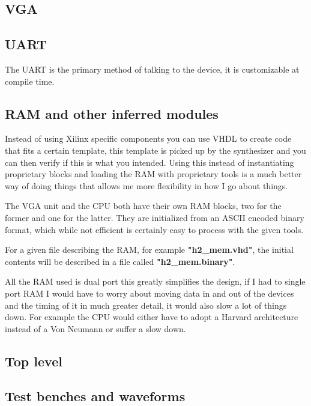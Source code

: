 \documentclass	[a4paper, 10pt]	{article}
\begin{document}

    \subsection{VGA}
    \subsection{UART}

      The UART is the primary method of talking to the device, it is customizable at
      compile time.

    \subsection{RAM and other inferred modules}

      Instead of using Xilinx specific components you can use VHDL to create code that
      fits a certain template, this template is picked up by the synthesizer and you  
      can then verify if this is what you intended. Using this instead of instantiating
      proprietary blocks and loading the RAM with proprietary tools is a much better
      way of doing things that allows me more flexibility in how I go about things.

      The VGA unit and the CPU both have their own RAM blocks, two for the former and
      one for the latter. They are initialized from an ASCII encoded binary format,
      which while not efficient is certainly easy to process with the given tools.

      For a given file describing the RAM, for example \textbf{"h2\_mem.vhd"}, 
      the initial contents will be described in a file called \textbf{"h2\_mem.binary"}.

      All the RAM used is dual port this greatly simplifies the design, if I had to single
      port RAM I would have to worry about moving data in and out of the devices and the
      timing of it in much greater detail, it would also slow a lot of things down. For example
      the CPU would either have to adopt a Harvard architecture instead of a Von Neumann 
      or suffer a slow down.

    \subsection{Top level}
    \subsection{Test benches and waveforms}
\end{document}
